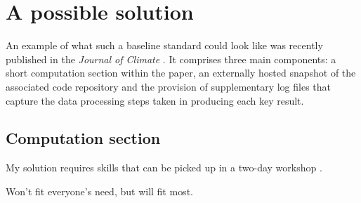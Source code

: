 \section{A possible solution}

An example of what such a baseline standard could look like was recently published in the \textit{Journal of Climate} \citep{Irving2015}. It comprises three main components: a short computation section within the paper, an externally hosted snapshot of the associated code repository and the provision of supplementary log files that capture the data processing steps taken in producing each key result. 

\subsection{Computation section}





My solution requires skills that can be picked up in a two-day workshop \citep{Wilson2014,Wilson2014a}.

Won't fit everyone's need, but will fit most.